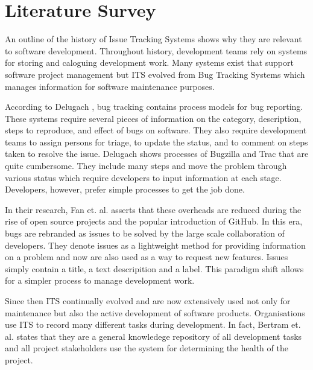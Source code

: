 \documentclass{mproj}
\begin{document}


\section{Literature Survey}  %

An outline of the history of Issue Tracking Systems shows why they are relevant to software development. Throughout history, development teams rely on systems for storing and caloguing development work. Many systems exist that support software project management but ITS evolved from Bug Tracking Systems which manages information for software maintenance purposes. 

According to Delugach \cite{Delugach:2007}, bug tracking contains process models for bug reporting. These systems require several pieces of information on the category, description, steps to reproduce, and effect of bugs on software. They also require development teams to assign persons for triage, to update the status, and to comment on steps taken to resolve the issue. Delugach shows processes of Bugzilla and Trac that are quite cumbersome. They include many steps and move the problem through various status which require developers to input information at each stage. Developers, however, prefer simple processes to get the job done.

In their research, Fan et. al. \cite{Fan:2017} asserts that these overheads are reduced during the rise of open source projects and the popular introduction of GitHub. In this era, bugs are rebranded as issues to be solved by the large scale collaboration of developers. They denote issues as a lightweight method for providing information on a problem and now are also used as a way to request new features. Issues simply contain a title, a text descripition and a label. This paradigm shift allows for a simpler process to manage development work.

Since then ITS continually evolved and are now extensively used not only for maintenance but also the active development of software products. Organisations use ITS to record many different tasks during development. In fact, Bertram et. al. \cite{Bertram:2010} states that they are a general knowledege repository of all development tasks and all project stakeholders use the system for determining the health of the project.
\end{document}

